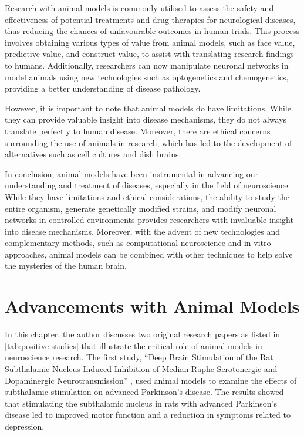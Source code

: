 \documentclass[10pt]{article}
\begin{document}
\begin{sloppypar}
  Research with animal models is commonly utilised to assess the safety and effectiveness of potential treatments and drug therapies for neurological diseases, thus reducing the chances of unfavourable outcomes in human trials. This process involves obtaining various types of value from animal models, such as face value, predictive value, and construct value, to assist with translating research findings to humans. Additionally, researchers can now manipulate neuronal networks in model animals using new technologies such as optogenetics and chemogenetics, providing a better understanding of disease pathology.

  However, it is important to note that animal models do have limitations. While they can provide valuable insight into disease mechanisms, they do not always translate perfectly to human disease. Moreover, there are ethical concerns surrounding the use of animals in research, which has led to the development of alternatives such as cell cultures and dish brains.

  In conclusion, animal models have been instrumental in advancing our understanding and treatment of diseases, especially in the field of neuroscience. While they have limitations and ethical considerations, the ability to study the entire organism, generate genetically modified strains, and modify neuronal networks in controlled environments provides researchers with invaluable insight into disease mechanisms. Moreover, with the advent of new technologies and complementary methods, such as computational neuroscience and in vitro approaches, animal models can be combined with other techniques to help solve the mysteries of the human brain.

  \section{Advancements with Animal Models}
  \label{sec:advancements}

  In this chapter, the author discusses two original research papers as listed in \autoref{tab:positive-studies} that illustrate the critical role of animal models in neuroscience research. The first study, “Deep Brain Stimulation of the Rat Subthalamic Nucleus Induced Inhibition of Median Raphe Serotonergic and Dopaminergic Neurotransmission” \citep{kocabicak_deep_2014}, used animal models to examine the effects of subthalamic stimulation on advanced Parkinson’s disease. The results showed that stimulating the subthalamic nucleus in rats with advanced Parkinson’s disease led to improved motor function and a reduction in symptoms related to depression.


\end{sloppypar}
\end{document}
